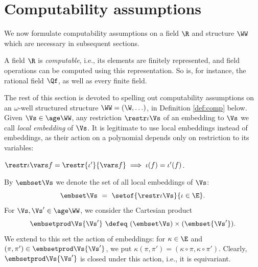 \section{Computability assumptions} \label{sec:comp}

We now formulate computability assumptions on a field $\R$ and structure $\WW$ 
which are necessary in subsequent sections.

A field $\R$ is \emph{computable}, i.e., its elements are finitely represented,
and field operations can be computed using this representation.
So is, for instance, the rational field $\Qf$, as well as every finite field.
%

The rest of this section is devoted to spelling out computability assumptions on
an $\omega$-well structured structure $\WW = (\W, \ldots)$, in
Definition \ref{def:comp} below.
Given $\Vs\in\age\WW$,
any restriction $\restr\iota \Vs$ of an embedding to $\Vs$ 
we call \emph{local embedding} of $\Vs$.
It is legitimate to use local embeddings instead of embeddings, 
as their action on a polynomial depends only on restriction to its variables:
%
\begin{lemma} \label{lem:restr}
$\restr \iota {\vars f} = \restr {\iota'} {\vars f} \implies \iota(f) = \iota'(f)$.
\end{lemma}
%
\noindent
By $\embset \Vs$ we denote the set of all local embeddings of $\Vs$:
\[
\embset \Vs \ = \ \setof{\restr \iota \Vs}{\iota\in\E}.
\] 
For $\Vs, \Vs'\in\age \WW$, we consider the Cartesian product
\[
\embsetprod \Vs {\Vs'} \ \defeq \ (\embset \Vs) \times (\embset {\Vs'}).
\]
We extend to this set the action of embeddings:
for $\kappa \in \E$ and $(\pi,\pi') \in \embsetprod \Vs {\Vs'}$, we put
$\kappa(\pi,\pi') = (\kappa\circ\pi, \kappa\circ\pi')$. 
Clearly, $\embsetprod \Vs  {\Vs'}$ is closed under this action, i.e., it is equivariant.


